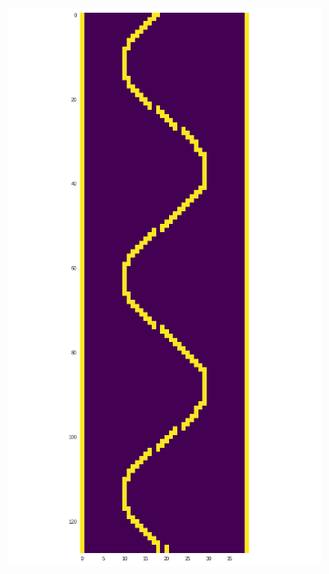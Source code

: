 \documentclass[]{article}
\begin{document}
\begin{figure}
	\centering
	\begin{subfigure}[b]{.49\textwidth}
		\centering
		\includegraphics[width=\linewidth]{figures/sin_boundary.png}
		\caption{}
		\label{fig:sin_boundary} 
	\end{subfigure}
	\begin{subfigure}[b]{0.49\textwidth}
		\centering

\end{subfigure}
\end{figure}
\end{document}
